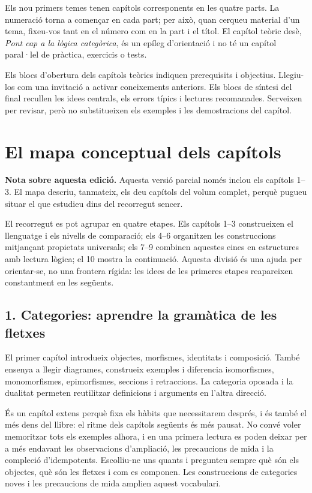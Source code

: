 Els nou primers temes tenen capítols corresponents en les quatre
parts. La numeració torna a començar en cada part; per això, quan
cerqueu material d'un tema, fixeu-vos tant en el número com en la
part i el títol. El capítol teòric desè, \emph{Pont cap a la lògica
categòrica}, és un epíleg d'orientació i no té un capítol paral·lel
de pràctica, exercicis o tests.

Els blocs d'obertura dels capítols teòrics indiquen prerequisits
i objectius. Llegiu-los com una invitació a activar coneixements
anteriors. Els blocs de síntesi del final recullen les idees centrals,
els errors típics i lectures recomanades. Serveixen per revisar,
però no substitueixen els exemples i les demostracions del capítol.

\section{El mapa conceptual dels capítols}
\label{sec:mapa-lectura}

\ifpublicacioparcial
\noindent\textbf{Nota sobre aquesta edició.} Aquesta versió parcial
només inclou els capítols 1--3. El mapa descriu, tanmateix, els deu
capítols del volum complet, perquè pugueu situar el que estudieu
dins del recorregut sencer.
\fi

El recorregut es pot agrupar en quatre etapes. Els capítols 1--3
construeixen el llenguatge i els nivells de comparació; els 4--6
organitzen les construccions mitjançant propietats universals;
els 7--9 combinen aquestes eines en estructures amb lectura lògica;
el 10 mostra la continuació. Aquesta divisió és una ajuda per orientar-se,
no una frontera rígida: les idees de les primeres etapes reapareixen
constantment en les següents.

\subsection*{1. Categories: aprendre la gramàtica de les fletxes}

El primer capítol introdueix objectes, morfismes, identitats i
composició. També ensenya a llegir diagrames, construeix exemples
i diferencia isomorfismes, monomorfismes, epimorfismes, seccions
i retraccions. La categoria oposada i la dualitat permeten
reutilitzar definicions i arguments en l'altra direcció.

És un capítol extens perquè fixa els hàbits que necessitarem després,
i és també el més dens del llibre: el ritme dels capítols següents és
més pausat. No convé voler memoritzar tots els exemples alhora, i en
una primera lectura es poden deixar per a més endavant les observacions
d'ampliació, les precaucions de mida i la compleció d'idempotents. Escolliu-ne uns
quants i pregunteu sempre què són els objectes, què són les fletxes
i com es componen. Les construccions de categories noves i les
precaucions de mida amplien aquest vocabulari.

